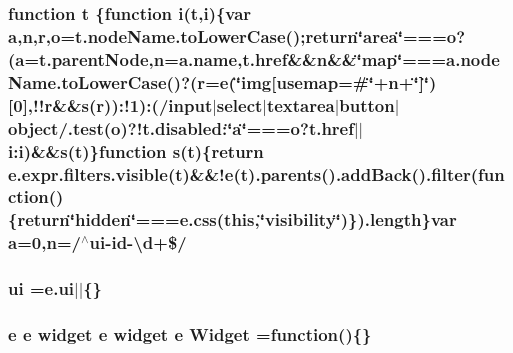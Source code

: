 \hypertarget{root_2static_2root_2js_2jquery-ui_8custom_8min_8js_a23c5666e83bbbceee94adcd0851f50c4}{
\subsubsection[{t}]{\setlength{\rightskip}{0pt plus 5cm}function t \{function {\bf i}(t,{\bf i})\{var {\bf a},{\bf n},{\bf r},{\bf o}=t.\-node\-Name.\-to\-Lower\-Case();return\char`\"{}area\char`\"{}===o?({\bf a}=t.\-parent\-Node,{\bf n}=a.\-name,t.\-href\&\&{\bf n}\&\&\char`\"{}map\char`\"{}===a.\-node\-Name.\-to\-Lower\-Case()?({\bf r}={\bf e}(\char`\"{}img\mbox{[}usemap=\#\char`\"{}+n+\char`\"{}\mbox{]}\char`\"{})\mbox{[}0\mbox{]},!!{\bf r}\&\&{\bf s}({\bf r}))\-:!1)\-:(/input$\vert$select$\vert$textarea$\vert${\bf button}$\vert$object/.test({\bf o})?!t.\-disabled\-:\char`\"{}a\char`\"{}===o?t.\-href$\vert$$\vert$i\-:i)\&\&{\bf s}(t)\}function {\bf s}(t)\{return {\bf e.\-expr.\-filters.\-visible}(t)\&\&!{\bf e}(t).parents().add\-Back().filter(function()\{return\char`\"{}hidden\char`\"{}===e.\-css(this,\char`\"{}visibility\char`\"{})\}).length\}var {\bf a}=0,{\bf n}=/$^\wedge${\bf ui}-\/id-\/\textbackslash{}{\bf d}+\$/}}\label{root_2static_2root_2js_2jquery-ui_8custom_8min_8js_a23c5666e83bbbceee94adcd0851f50c4}
\hypertarget{root_2static_2root_2js_2jquery-ui_8custom_8min_8js_a8ebc3a47bff7b1c2623695f3db4c0761}{
\subsubsection[{ui}]{ ui =e.\-ui$\vert$$\vert$\{\}}}\label{root_2static_2root_2js_2jquery-ui_8custom_8min_8js_a8ebc3a47bff7b1c2623695f3db4c0761}
\hypertarget{root_2static_2root_2js_2jquery-ui_8custom_8min_8js_ac276e64ad973eca0aa49ec12c72d57ef}{
\subsubsection[{Widget}]{ {\bf e} {\bf e} {\bf widget} {\bf e} {\bf widget} {\bf e} Widget =function()\{\}}}\label{root_2static_2root_2js_2jquery-ui_8custom_8min_8js_ac276e64ad973eca0aa49ec12c72d57ef}
